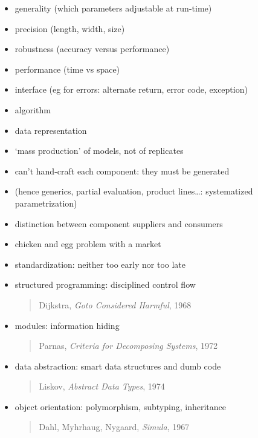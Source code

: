 \documentclass{sepslide-soa-faked} %
\begin{document}
\begin{slide}
\begin{itemize}
\item generality (which parameters adjustable at run-time)
\item precision (length, width, size)
\item robustness (accuracy versus performance)
\item performance (time vs space)
\item interface (eg for errors: alternate return, error code, exception)
\item algorithm
\item data representation
\end{itemize}
\end{slide}

\begin{slide}
\begin{itemize}
\item `mass production' of models, not of replicates
\item can't hand-craft each component: they must be generated
\item (hence generics, partial evaluation, product lines\ldots: 
  systematized parametrization)
\item distinction between component suppliers and consumers
\item chicken and egg problem with a market
\item standardization: neither too early nor too late
\end{itemize}
\end{slide}

\begin{slide}
\begin{itemize}
\item structured programming: disciplined control flow
\begin{quote} Dijkstra, \textit{Goto Considered Harmful}, 1968 \end{quote}
\item modules: information hiding
\begin{quote} Parnas, \textit{Criteria for Decomposing Systems}, 1972 \end{quote}
\item data abstraction: smart data structures and dumb code
\begin{quote} Liskov, \textit{Abstract Data Types}, 1974 \end{quote}
\item object orientation: polymorphism, subtyping, inheritance
\begin{quote} Dahl, Myhrhaug, Nygaard, \textit{Simula}, 1967 \end{quote}
\end{itemize}
\end{slide}
\end{document}
